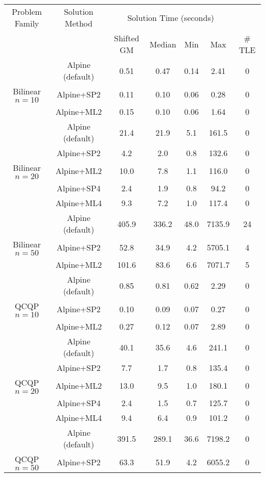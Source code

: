 \documentclass{article}
\begin{document}
\begin{table}[t]
\centering
\begin{tabular}{ c | c | c c c c | c }
\hline
Problem Family & Solution Method & \multicolumn{4}{c|}{Solution Time (seconds)} & \\
& & Shifted GM & Median & Min & Max & \# TLE \\ \hline
&  Alpine (default)  &  0.51  &  0.47  &  0.14  &  2.41  &  0  \\
Bilinear $n = 10$  &  Alpine+SP2  &  0.11  &  0.10  &  0.06  &  0.28  &  0  \\
&  Alpine+ML2  &  0.15  &  0.10  &  0.06  &  1.64  &  0  \\[0.1in]
&  Alpine (default)  &  21.4  &  21.9  &  5.1  &  161.5  &  0  \\
&  Alpine+SP2  &  4.2  &  2.0  &  0.8  &  132.6  &  0  \\
Bilinear $n = 20$  &  Alpine+ML2  &  10.0  &  7.8  &  1.1  &  116.0  &  0  \\
&  Alpine+SP4  &  2.4  &  1.9  &  0.8  &  94.2  &  0  \\
&  Alpine+ML4  &  9.3  &  7.2  &  1.0  &  117.4  &  0  \\[0.1in]
&  Alpine (default)  &  405.9  &  336.2  &  48.0  &  7135.9  &  24  \\
Bilinear $n = 50$  &  Alpine+SP2  &  52.8  &  34.9  &  4.2  &  5705.1  & 4  \\
&  Alpine+ML2  &  101.6  &  83.6  &  6.6  &  7071.7  &  5  \\[0.1in]
&  Alpine (default)  &  0.85  &  0.81  &  0.62  &  2.29  &  0  \\
QCQP $n = 10$  &  Alpine+SP2  &  0.10  &  0.09  &  0.07  &  0.27  &  0  \\
&  Alpine+ML2  &  0.27  &  0.12  &  0.07  &  2.89  &  0  \\[0.1in]
&  Alpine (default)  &  40.1  &  35.6  &  4.6  &  241.1  &  0  \\
&  Alpine+SP2  &  7.7  &  1.7  &  0.8  &  135.4  &  0  \\
QCQP $n = 20$  &  Alpine+ML2  &  13.0  &  9.5  &  1.0  &  180.1  &  0  \\
&  Alpine+SP4  &  2.4  &  1.5  &  0.7  &  125.7  &  0  \\
&  Alpine+ML4  &  9.4  &  6.4  &  0.9  &  101.2  &  0  \\[0.1in]
&  Alpine (default)  &  391.5  &  289.1  &  36.6  &  7198.2  &  0  \\
QCQP $n = 50$  &  Alpine+SP2  &  63.3  &  51.9  &  4.2  &  6055.2  &  0 \\

\end{tabular}
\end{table}
\end{document}
